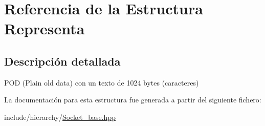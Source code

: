 \hypertarget{structRepresenta}{}\section{Referencia de la Estructura Representa}
\label{structRepresenta}


\subsection{Descripción detallada}
P\+OD (Plain old data) con un texto de 1024 bytes (caracteres) 

La documentación para esta estructura fue generada a partir del siguiente fichero\+:\begin{DoxyCompactItemize}
\item 
include/hierarchy/\hyperlink{Socket__base_8hpp}{Socket\+\_\+base.\+hpp}\end{DoxyCompactItemize}
